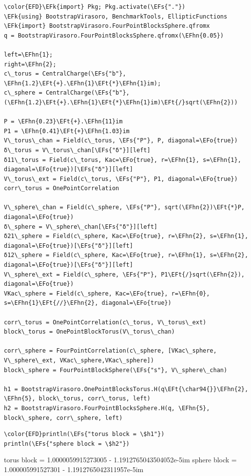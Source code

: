 \documentclass[a4paper]{article}
\numberwithin{equation}{section}
\newcommand{\EFs}[1]{\textcolor{EFs}{#1}} %
\newcommand{\EFk}[1]{\textcolor{EFk}{#1}} %
\newcommand{\EFt}[1]{\textcolor{EFt}{#1}} %
\newcommand{\EFo}[1]{\textcolor{EFo}{#1}} %
\newcommand{\EFhn}[1]{\textcolor{EFhn}{#1}} %
\begin{document}
\begin{Code}
\begin{Verbatim}
\color{EFD}\EFk{import} Pkg; Pkg.activate(\EFs{"."})
\EFk{using} BootstrapVirasoro, BenchmarkTools, EllipticFunctions
\EFk{import} BootstrapVirasoro.FourPointBlocksSphere.qfromx
q = BootstrapVirasoro.FourPointBlocksSphere.qfromx(\EFhn{0.05})

left=\EFhn{1};
right=\EFhn{2};
c\_torus = CentralCharge(\EFs{"b"}, \EFhn{1.2}\EFt{+}.\EFhn{1}\EFt{*}\EFhn{1}im);
c\_sphere = CentralCharge(\EFs{"b"}, (\EFhn{1.2}\EFt{+}.\EFhn{1}\EFt{*}\EFhn{1}im)\EFt{/}sqrt(\EFhn{2}))

P = \EFhn{0.23}\EFt{+}.\EFhn{11}im
P1 = \EFhn{0.41}\EFt{+}\EFhn{1.03}im
V\_torus\_chan = Field(c\_torus, \EFs{"P"}, P, diagonal=\EFo{true})
δ\_torus = V\_torus\_chan[\EFs{"δ"}][left]
δ11\_torus = Field(c\_torus, Kac=\EFo{true}, r=\EFhn{1}, s=\EFhn{1}, diagonal=\EFo{true})[\EFs{"δ"}][left]
V\_torus\_ext = Field(c\_torus, \EFs{"P"}, P1, diagonal=\EFo{true})
corr\_torus = OnePointCorrelation

V\_sphere\_chan = Field(c\_sphere, \EFs{"P"}, sqrt(\EFhn{2})\EFt{*}P, diagonal=\EFo{true})
δ\_sphere = V\_sphere\_chan[\EFs{"δ"}][left]
δ21\_sphere = Field(c\_sphere, Kac=\EFo{true}, r=\EFhn{2}, s=\EFhn{1}, diagonal=\EFo{true})[\EFs{"δ"}][left]
δ12\_sphere = Field(c\_sphere, Kac=\EFo{true}, r=\EFhn{1}, s=\EFhn{2}, diagonal=\EFo{true})[\EFs{"δ"}][left]
V\_sphere\_ext = Field(c\_sphere, \EFs{"P"}, P1\EFt{/}sqrt(\EFhn{2}), diagonal=\EFo{true})
VKac\_sphere = Field(c\_sphere, Kac=\EFo{true}, r=\EFhn{0}, s=\EFhn{1}\EFt{//}\EFhn{2}, diagonal=\EFo{true})

corr\_torus = OnePointCorrelation(c\_torus, V\_torus\_ext)
block\_torus = OnePointBlockTorus(V\_torus\_chan)

corr\_sphere = FourPointCorrelation(c\_sphere, [VKac\_sphere, V\_sphere\_ext, VKac\_sphere,VKac\_sphere])
block\_sphere = FourPointBlockSphere(\EFs{"s"}, V\_sphere\_chan)

h1 = BootstrapVirasoro.OnePointBlocksTorus.H(q\EFt{\char94{}}\EFhn{2}, \EFhn{5}, block\_torus, corr\_torus, left)
h2 = BootstrapVirasoro.FourPointBlocksSphere.H(q, \EFhn{5}, block\_sphere, corr\_sphere, left)
\end{Verbatim}
\end{Code}

\begin{Code}
\begin{Verbatim}
\color{EFD}println(\EFs{"torus block = \$h1"})
println(\EFs{"sphere block = \$h2"})
\end{Verbatim}
\end{Code}
torus block = 1.0000059915273005 - 1.1912765043504052e-5im
sphere block = 1.000005991527301 - 1.1912765042311957e-5im
\end{document}
